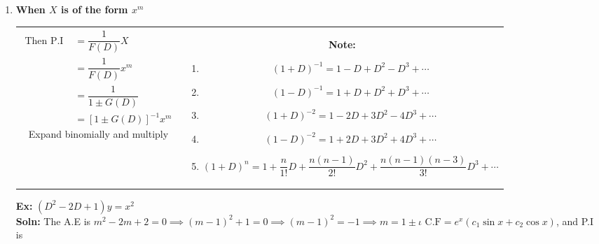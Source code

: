 \documentclass[a4paper, titlepage]{article}
\begin{document}
\begin{enumerate}[label=\textbf{\Roman*}]
            \begin{center}
                \date{$7^{\text{th}}$ September 2021}
            \end{center}
            \item \textbf{When $X$ is of the form $x^m$} \hfill \\
            \begin{tabularx}{\linewidth}{c | c}
                \begin{minipage}[c]{0.5\linewidth}
                    {
                        \begin{align*}
                            \text{Then P.I } &= \dfrac{1}{F(D)}X \\
                                        &= \dfrac{1}{F(D)}x^m \\
                                        &= \dfrac{1}{1 \pm G(D)} \\
                                        &= \left[ 1 \pm G(D) \right]^{-1} x^m
                        \end{align*}
                    }
                    Expand binomially and multiply
                \end{minipage}
                &
                \begin{minipage}[c]{0.5\linewidth}
                    \textbf{Note: }
                    \begin{enumerate}[label=\textbf{\arabic*}]
                        \item $(1+D)^{-1} = 1 - D + D^2 - D^3 + \cdots$
                        \item $(1-D)^{-1} = 1 + D + D^2 + D^3 + \cdots$
                        \item $(1+D)^{-2} = 1 - 2D + 3D^2 - 4D^3 + \cdots$
                        \item $(1-D)^{-2} = 1 + 2D + 3D^2 + 4D^3 + \cdots$
                        \item $(1+D)^n = 1 + \dfrac{n}{1!}D + \dfrac{n(n-1)}{2!}D^2 + \dfrac{n(n-1)(n-3)}{3!}D^3 + \cdots$
                    \end{enumerate}    
                \end{minipage}
            \end{tabularx}
            \textbf{Ex: } $(D^2 -2D + 1)y = x^2$ \hfill \\
            \textbf{Soln:} The A.E is $m^2 -2m + 2 = 0 \implies
            (m - 1) ^2 + 1 = 0 \implies (m-1)^2 = -1 \implies m = 1 \pm \iota$
            $\text{C.F} = e^x(c_1\sin x + c_2\cos x)$, and P.I is 

\end{enumerate}
\end{document}
